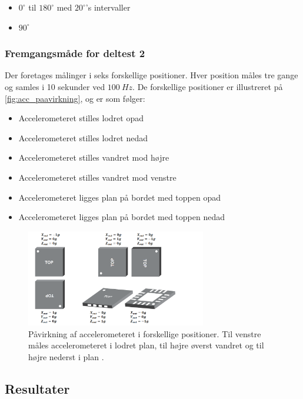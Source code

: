 \begin{itemize}
\item $0^{\circ}$ til $180^{\circ}$ med $20^{\circ}$'s intervaller
\item $90^{\circ}$  
\end{itemize}


\subsubsection{Fremgangsmåde for deltest 2}\label{sec:acc_fremgangsmaade}
Der foretages målinger i seks forskellige positioner. Hver position måles tre gange og samles i 10 sekunder ved $100~Hz$. De forskellige positioner er illustreret på \autoref{fig:acc_paavirkning}, og er som følger: 
\begin{itemize}
\item Accelerometeret stilles lodret opad
\item Accelerometeret stilles lodret nedad
\item Accelerometeret stilles vandret mod højre
\item Accelerometeret stilles vandret mod venstre
\item Accelerometeret ligges plan på bordet med toppen opad
\item Accelerometeret ligges plan på bordet med toppen nedad
\end{itemize}

\begin{figure}[H]
\centering
\includegraphics[width=0.7\textwidth]{figures/acc_paavirkning}
\caption{Påvirkning af accelerometeret i forskellige positioner. Til venstre måles accelerometeret i lodret plan, til højre øverst vandret og til højre nederst i plan \citep{analogdevices2010}.}
\label{fig:acc_paavirkning}
\end{figure}

\subsection{Resultater} 

